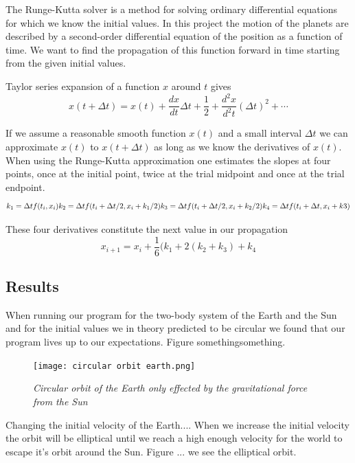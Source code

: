\documentclass[a4paper,12pt, english]{article}
\begin{document}
The Runge-Kutta solver is a method for solving ordinary differential equations for which we know the initial values. In this project the motion of the planets are described by a second-order differential equation of the position as a function of time. We want to find the propagation of this function forward in time starting from the given initial values. 

Taylor series expansion of a function $x$ around $t$ gives
$$ x(t+ \Delta t) = x(t) + \frac{dx}{dt} \Delta t + \frac{1}{2} + \frac{d^2 x}{d^2 t} (\Delta t)^2 + \cdots $$

If we assume a reasonable smooth function $x(t)$ and a small interval $\Delta t$ we can approximate $x(t)$ to $x(t + \Delta t)$ as long as we know the derivatives of $x(t)$. 
When using the Runge-Kutta approximation one estimates the slopes at four points, once at the initial point, twice at the trial midpoint and once at the trial endpoint. 
$$ k_1 = \Delta t f(t_i,x_i) \\
k_2 = \Delta t f(t_i + \Delta t /2, x_i + k_1/2) \\
k_3 = \Delta t f(t_i + \Delta t/2, x_i + k_2/2) \\
k_4 = \Delta t f(t_i + \Delta t, x_i + k3) $$

These four derivatives constitute the next value in our propagation
$$x_{i+1} = x_i + \frac{1}{6} (k_1 + 2(k_2+k_3) + k_4$$


\subsection*{Results}
When running our program for the two-body system of the Earth and the Sun and for the initial values we in theory predicted to be circular we found that our program lives up to our expectations. Figure somethingsomething.

\begin{figure}[h!]
  \centering
    \texttt{[image: circular orbit earth.png]}
  \caption{\textit{Circular orbit of the Earth only effected by the gravitational force from the Sun}}
\end{figure}


Changing the initial velocity of the Earth....
When we increase the initial velocity the orbit will be elliptical until we reach a high enough velocity for the world to escape it's orbit around the Sun. Figure ... we see the elliptical orbit.  
\end{document}
